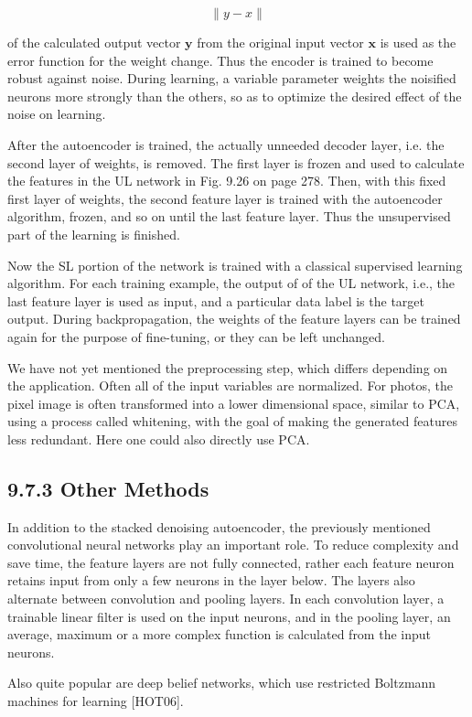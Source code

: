 \documentclass[10pt]{article}
\begin{document}
$$
\|y-x\|
$$

of the calculated output vector $\boldsymbol{y}$ from the original input vector $\boldsymbol{x}$ is used as the error function for the weight change. Thus the encoder is trained to become robust against noise. During learning, a variable parameter weights the noisified neurons more strongly than the others, so as to optimize the desired effect of the noise on learning.

After the autoencoder is trained, the actually unneeded decoder layer, i.e. the second layer of weights, is removed. The first layer is frozen and used to calculate the features in the UL network in Fig. 9.26 on page 278. Then, with this fixed first layer of weights, the second feature layer is trained with the autoencoder algorithm, frozen, and so on until the last feature layer. Thus the unsupervised part of the learning is finished.

Now the SL portion of the network is trained with a classical supervised learning algorithm. For each training example, the output of of the UL network, i.e., the last feature layer is used as input, and a particular data label is the target output. During backpropagation, the weights of the feature layers can be trained again for the purpose of fine-tuning, or they can be left unchanged.

We have not yet mentioned the preprocessing step, which differs depending on the application. Often all of the input variables are normalized. For photos, the pixel image is often transformed into a lower dimensional space, similar to PCA, using a process called whitening, with the goal of making the generated features less redundant. Here one could also directly use PCA.

\subsection*{9.7.3 Other Methods}
In addition to the stacked denoising autoencoder, the previously mentioned convolutional neural networks play an important role. To reduce complexity and save time, the feature layers are not fully connected, rather each feature neuron retains input from only a few neurons in the layer below. The layers also alternate between convolution and pooling layers. In each convolution layer, a trainable linear filter is used on the input neurons, and in the pooling layer, an average, maximum or a more complex function is calculated from the input neurons.

Also quite popular are deep belief networks, which use restricted Boltzmann machines for learning [HOT06].
\end{document}

